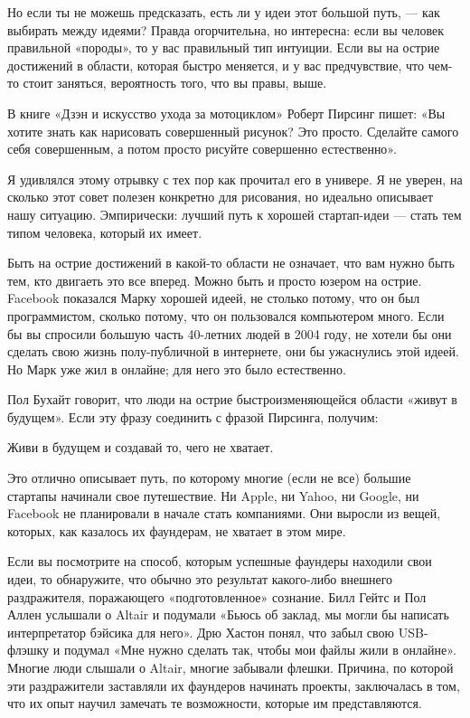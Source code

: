 \documentclass[ebook,12pt,oneside,openany]{memoir}
\begin{document}
Но если ты не можешь предсказать, есть ли у идеи этот большой путь, —
как выбирать между идеями? Правда огорчительна, но интересна: если вы
человек правильной «породы», то у вас правильный тип интуиции. Если вы
на острие достижений в области, которая быстро меняется, и у вас
предчувствие, что чем-то стоит заняться, вероятность того, что вы
правы, выше.

В книге «Дзэн и искусство ухода за мотоциклом» Роберт Пирсинг пишет:
«Вы хотите знать как нарисовать совершенный рисунок? Это просто.
Сделайте самого себя совершенным, а потом просто рисуйте совершенно
естественно».

Я удивлялся этому отрывку с тех пор как прочитал его в универе. Я не
уверен, на сколько этот совет полезен конкретно для рисования, но
идеально описывает нашу ситуацию. Эмпирически: лучший путь к хорошей
стартап-идеи — стать тем типом человека, который их имеет.

Быть на острие достижений в какой-то области не означает, что вам
нужно быть тем, кто двигаеть это все вперед. Можно быть и просто
юзером на острие. Facebook показался Марку хорошей идеей, не столько
потому, что он был программистом, сколько потому, что он пользовался
компьютером много. Если бы вы спросили большую часть 40-летних людей в
2004 году, не хотели бы они сделать свою жизнь полу-публичной в
интернете, они бы ужаснулись этой идеей. Но Марк уже жил в онлайне;
для него это было естественно.

Пол Бухайт говорит, что люди на острие быстроизменяющейся области
«живут в будущем». Если эту фразу соединить с фразой Пирсинга,
получим:

Живи в будущем и создавай то, чего не хватает.

Это отлично описывает путь, по которому многие (если не все) большие
стартапы начинали свое путешествие. Ни Apple, ни Yahoo, ни Google, ни
Facebook не планировали в начале стать компаниями. Они выросли из
вещей, которых, как казалось их фаундерам, не хватает в этом мире.

Если вы посмотрите на способ, которым успешные фаундеры находили свои
идеи, то обнаружите, что обычно это результат какого-либо внешнего
раздражителя, поражающего «подготовленное» сознание. Билл Гейтс и Пол
Аллен услышали о Altair и подумали «Бьюсь об заклад, мы могли бы
написать интерпретатор бэйсика для него». Дрю Хастон понял, что забыл
свою USB-флэшку и подумал «Мне нужно сделать так, чтобы мои файлы жили
в онлайне». Многие люди слышали о Altair, многие забывали флешки.
Причина, по которой эти раздражители заставляли их фаундеров начинать
проекты, заключалась в том, что их опыт научил замечать те
возможности, которые им представляются.
\end{document}
